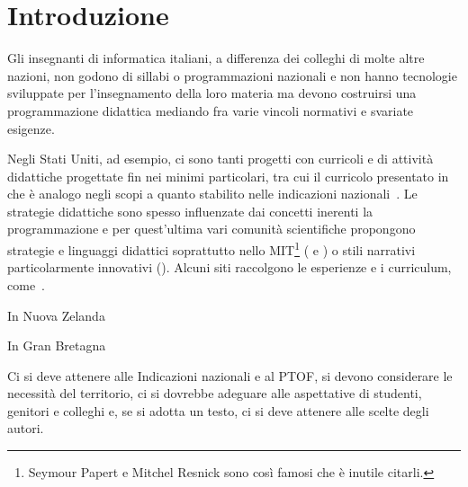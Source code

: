 \documentclass{easychair}
\begin{document}

\setcounter{tocdepth}{2}
{\small
\tableofcontents}

%
%

\section{Introduzione}
\label{sect:introduction}

Gli insegnanti di informatica italiani, a differenza dei colleghi di molte
altre nazioni, non godono di sillabi o programmazioni nazionali e non hanno
tecnologie sviluppate per l'insegnamento della loro materia ma devono
costruirsi una programmazione didattica mediando fra varie vincoli normativi
e svariate esigenze.

Negli Stati Uniti, ad esempio, ci sono tanti progetti con curricoli e
di attività didattiche progettate fin nei minimi particolari,
tra cui il curricolo presentato in~\cite{fisler2021evolving} che è analogo
negli scopi a quanto stabilito nelle indicazioni nazionali~\cite{indicazioniNazionali}.
Le strategie didattiche sono spesso influenzate dai concetti inerenti la programmazione
e per quest'ultima vari comunità scientifiche propongono strategie e linguaggi didattici
soprattutto nello MIT\footnote{%
Seymour Papert e Mitchel Resnick sono così famosi che è inutile citarli.} %
(\cite{abelson1996structure} e \cite{abelson2022structure})
o stili narrativi particolarmente innovativi (\cite{friedman1995little}).
Alcuni siti raccolgono le esperienze e i curriculum, come~\cite{cs4all}.

In Nuova Zelanda

In Gran Bretagna

Ci si deve attenere alle Indicazioni nazionali e al PTOF,
si devono considerare le necessità del territorio,
ci si dovrebbe adeguare alle aspettative di studenti, genitori e colleghi e,
se si adotta un testo, ci si deve attenere alle scelte degli autori.
\end{document}
